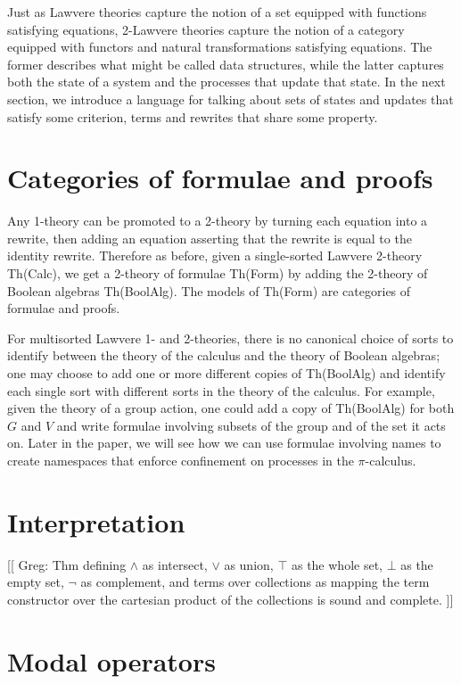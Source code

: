 \documentclass{llncs}
\begin{document}
Just as Lawvere theories capture the notion of a set equipped with functions satisfying equations, 2-Lawvere theories capture the notion of a category equipped with functors and natural transformations satisfying equations.  The former describes what might be called data structures, while the latter captures both the state of a system and the processes that update that state.  In the next section, we introduce a language for talking about sets of states and updates that satisfy some criterion, terms and rewrites that share some property.

\section{Categories of formulae and proofs}

Any 1-theory can be promoted to a 2-theory by turning each equation into a rewrite, then adding an equation asserting that the rewrite is equal to the identity rewrite.  Therefore as before, given a single-sorted Lawvere 2-theory Th(Calc), we get a 2-theory of formulae Th(Form) by adding the 2-theory of Boolean algebras Th(BoolAlg).  The models of Th(Form) are categories of formulae and proofs.

For multisorted Lawvere 1- and 2-theories, there is no canonical choice of sorts to identify between the theory of the calculus and the theory of Boolean algebras; one may choose to add one or more different copies of Th(BoolAlg) and identify each single sort with different sorts in the theory of the calculus.  For example, given the theory of a group action, one could add a copy of Th(BoolAlg) for both $G$ and $V$ and write formulae involving subsets of the group and of the set it acts on.  Later in the paper, we will see how we can use formulae involving names to create namespaces that enforce confinement on processes in the $\pi$-calculus.

\section{Interpretation}

[[ Greg: Thm defining $\land$ as intersect, $\lor$ as union, $\top$ as the whole set, $\bot$ as the empty set, $\neg$ as complement, and terms over collections as mapping the term constructor over the cartesian product of the collections is sound and complete. ]]

\section{Modal operators}
\end{document}
